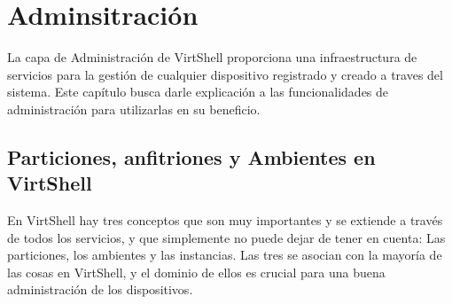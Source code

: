 \chapter{Adminsitración}
\label{capadministracion}

La capa de Administración de VirtShell proporciona una infraestructura de servicios para la gestión de cualquier dispositivo registrado y creado a traves del sistema. Este capítulo busca darle explicación a las funcionalidades de administración para utilizarlas en su beneficio.

\section{Particiones, anfitriones y Ambientes en VirtShell}
En VirtShell hay tres conceptos que son muy importantes y se extiende a través de todos los servicios, y que simplemente no puede dejar de tener en cuenta: Las particiones, los ambientes y las instancias. Las tres se asocian con la mayoría de las cosas en VirtShell, y el dominio de ellos es crucial para una buena administración de los dispositivos. 

